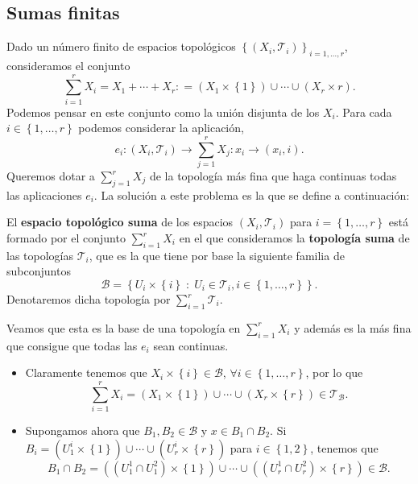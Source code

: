 \subsection{Sumas finitas}
Dado un número finito de espacios topológicos $\displaystyle \left\{ \left(X_{i}, \mathcal{T}_{i}\right)\right\} _{i = 1, \ldots, r} $, consideramos el conjunto
\[\sum^{r}_{i= 1}X_{i} = X_{1} + \cdots + X_{r} : = \left(X_{1} \times \left\{ 1\right\} \right) \cup \cdots \cup \left(X_{r} \times r\right) .\]
Podemos pensar en este conjunto como la unión disjunta de los $\displaystyle X_{i} $. Para cada $\displaystyle i \in \left\{ 1, \ldots, r\right\}  $ podemos considerar la aplicación, 
\[e_{i} : \left(X_{i}, \mathcal{T}_{i}\right)\to \sum^{r}_{j = 1}X_{j} : x_{i} \to \left(x_{i}, i\right) .\]
Queremos dotar a $\displaystyle \sum^{r}_{j= 1}X_{j} $ de la topología más fina que haga continuas todas las aplicaciones $\displaystyle e_{i} $. La solución a este problema es la que se define a continuación:
\begin{definition}
	El \textbf{espacio topológico suma} de los espacios $\displaystyle \left(X_{i}, \mathcal{T}_{i}\right)  $ para $\displaystyle i = \left\{ 1, \ldots, r\right\}  $ está formado por el conjunto $\displaystyle \sum^{r}_{i = 1}X_{i} $ en el que consideramos la \textbf{topología suma} de las topologías $\displaystyle \mathcal{T}_{i} $, que es la que tiene por base la siguiente familia de subconjuntos
	\[ \mathcal{B} = \left\{ U_{i} \times \left\{ i\right\} \; : \; U_{i} \in \mathcal{T}_{i}, i \in \left\{ 1, \ldots, r\right\} \right\}  .\]
	Denotaremos dicha topología por $\displaystyle \sum^{r}_{i=1}\mathcal{T}_{i} $. 
\end{definition}
Veamos que esta es la base de una topología en $\displaystyle \sum^{r}_{i=1}X_{i} $ y además es la más fina que consigue que todas las $\displaystyle e_{i} $ sean continuas. 
\begin{itemize}
	\item Claramente tenemos que $\displaystyle X_{i} \times \left\{ i\right\} \in \mathcal{B} $, $\displaystyle \forall i \in \left\{ 1, \ldots, r\right\}  $, por lo que 
		\[\sum^{r}_{i = 1}X_{i} = (X_{1} \times \left\{ 1\right\}) \cup \cdots \cup (X_{r} \times \left\{ r\right\}) \in \mathcal{T}_{\mathcal{B}} .\]
	\item Supongamos ahora que $\displaystyle B_{1}, B_{2} \in \mathcal{B} $ y $\displaystyle x \in B_{1} \cap B_{2} $. Si $\displaystyle B_{i} = \left(U_{1}^{i} \times \left\{ 1\right\} \right)\cup \cdots \cup \left(U_{r}^{i}\times \left\{ r\right\} \right)  $ para $\displaystyle i \in \left\{ 1,2\right\}  $, tenemos que 
		\[B_{1} \cap B_{2} = \left(\left(U_{1}^{1}\cap U_{1}^{2}\right)\times \left\{ 1\right\} \right) \cup \cdots \cup \left(\left(U_{r}^{1}\cap U_{r}^{2}\right)\times \left\{ r\right\} \right) \in \mathcal{B}.\]
\end{itemize}

